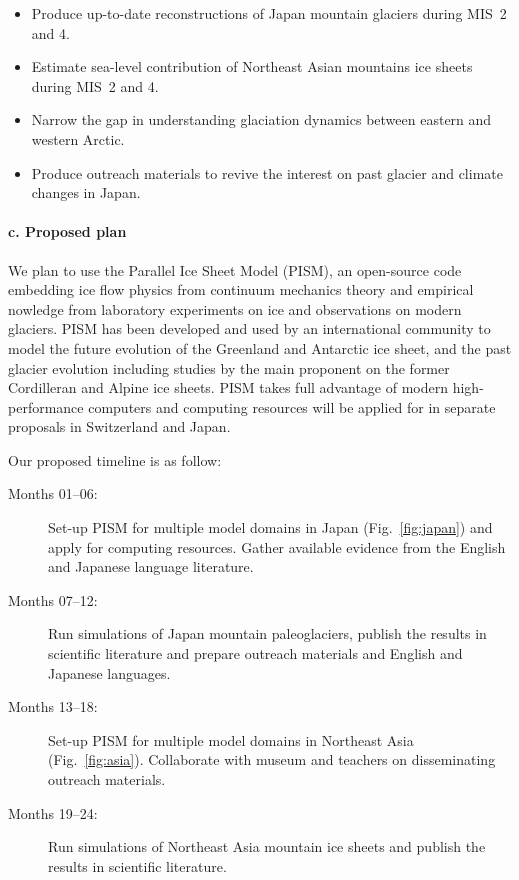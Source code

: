 \documentclass{article}
\begin{document}
    \begin{itemize}
      \item{Produce up-to-date reconstructions of Japan mountain glaciers
            during MIS~2 and 4.}
      \item{Estimate sea-level contribution of Northeast Asian mountains ice
            sheets during MIS~2 and 4.}
      \item{Narrow the gap in understanding glaciation dynamics between
            eastern and western Arctic.}
      \item{Produce outreach materials to revive the interest on past glacier
            and climate changes in Japan.}
    \end{itemize}


\paragraph{c. Proposed plan}

    We plan to use the Parallel Ice Sheet Model (PISM), an open-source code
    embedding ice flow physics from continuum mechanics theory and empirical
    nowledge from laboratory experiments on ice and observations on modern
    glaciers. PISM has been developed and used by an international community
    to model the future evolution of the Greenland and Antarctic ice sheet, and
    the past glacier evolution including studies by the main proponent on the
    former Cordilleran and Alpine ice sheets. PISM takes full advantage of modern
    high-performance computers and computing resources will be applied for in
    separate proposals in Switzerland and Japan.

    Our proposed timeline is as follow:
    \begin{description}
      \item[Months 01--06:]
        Set-up PISM for multiple model domains in Japan (Fig.~\ref{fig:japan})
        and apply for computing resources. Gather available evidence from the
        English and Japanese language literature.
      \item[Months 07--12:]
        Run simulations of Japan mountain paleoglaciers, publish the results in
        scientific literature and prepare outreach materials and English and
        Japanese languages.
      \item[Months 13--18:]
        Set-up PISM for multiple model domains in Northeast Asia
        (Fig.~\ref{fig:asia}). Collaborate with museum and teachers on
        disseminating outreach materials.
      \item[Months 19--24:]
        Run simulations of Northeast Asia mountain ice sheets and publish the
        results in scientific literature.
    \end{description}
\end{document}
